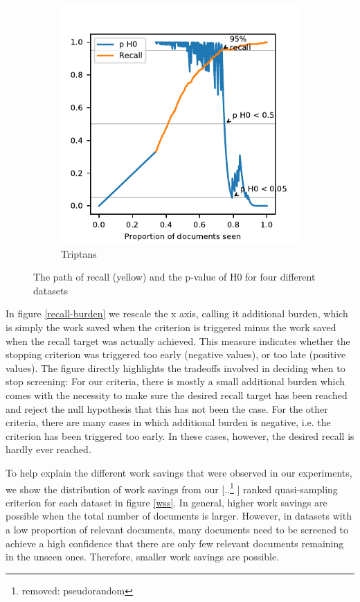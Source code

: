 \documentclass{bmcart}
\providecommand{\DIFadd}[1]{{\protect\color{blue} \sf #1}} %
\providecommand{\DIFdel}[1]{{\protect\color{red} [..\footnote{removed: #1} ]}} %
\providecommand{\DIFaddbegin}{} %
\providecommand{\DIFaddend}{} %
\providecommand{\DIFdelbegin}{} %
\providecommand{\DIFdelend}{} %
\providecommand{\DIFaddbeginFL}{} %
\providecommand{\DIFaddendFL}{} %
\providecommand{\DIFdelendFL}{} %
\newcommand{\DIFscaledelfig}{0.5}
\newlength{\DIFdelgraphicswidth} %
\newlength{\DIFdelgraphicsheight} %
\newcommand{\DIFaddincludegraphics}[2][]{{\color{blue}\fbox{\DIFOincludegraphics[#1]{#2}}}} %
\newcommand{\DIFdelincludegraphics}[2][]{%
\sbox{\DIFdelgraphicsbox}{\DIFOincludegraphics[#1]{#2}}%
\settoboxwidth{\DIFdelgraphicswidth}{\DIFdelgraphicsbox} %
\settoboxtotalheight{\DIFdelgraphicsheight}{\DIFdelgraphicsbox} %
\scalebox{\DIFscaledelfig}{%
\parbox[b]{\DIFdelgraphicswidth}{\usebox{\DIFdelgraphicsbox}\\[-\baselineskip] \rule{\DIFdelgraphicswidth}{0em}}\llap{\resizebox{\DIFdelgraphicswidth}{\DIFdelgraphicsheight}{%
\setlength{\unitlength}{\DIFdelgraphicswidth}%
\begin{picture}(1,1)%
\thicklines\linethickness{2pt} %
{\color[rgb]{1,0,0}\put(0,0){\framebox(1,1){}}}%
{\color[rgb]{1,0,0}\put(0,0){\line( 1,1){1}}}%
{\color[rgb]{1,0,0}\put(0,1){\line(1,-1){1}}}%
\end{picture}%
}\hspace*{3pt}}} %
} %
\DeclareRobustCommand{\DIFaddbegin}{\DIFOaddbegin \let\includegraphics\DIFaddincludegraphics} %
\DeclareRobustCommand{\DIFaddend}{\DIFOaddend \let\includegraphics\DIFOincludegraphics} %
\DeclareRobustCommand{\DIFdelbegin}{\DIFOdelbegin \let\includegraphics\DIFdelincludegraphics} %
\DeclareRobustCommand{\DIFdelend}{\DIFOaddend \let\includegraphics\DIFOincludegraphics} %
\DeclareRobustCommand{\DIFaddbeginFL}{\DIFOaddbeginFL \let\includegraphics\DIFaddincludegraphics} %
\DeclareRobustCommand{\DIFaddendFL}{\DIFOaddendFL \let\includegraphics\DIFOincludegraphics} %
\DeclareRobustCommand{\DIFdelendFL}{\DIFOaddendFL \let\includegraphics\DIFOincludegraphics} %
\begin{document}
\begin{figure}
\begin{subfigure}[b]{0.475\textwidth}
\DIFdelendFL \DIFaddbeginFL \includegraphics[width=\textwidth]{2_figs_h0_paths_Triptans.pdf}
			\DIFaddendFL \caption[]%
			{{\small Triptans}}    
			\label{fig:Triptans}
		\end{subfigure}

		\caption{\small The path of recall (yellow) and the p-value of H0 for four different datasets} 
		\label{H0paths}
	\end{figure}

	In figure \ref{recall-burden} we rescale the x axis, calling it additional burden, which is simply the work saved when the criterion is triggered minus the work saved when the recall target was actually achieved. This measure indicates whether the stopping criterion was triggered too early (negative values), or too late (positive values). The figure directly highlights the tradeoffs involved in deciding when to stop screening: For our criteria, there is mostly a small additional burden which comes with the necessity to make sure the desired recall target has been reached and reject the null hypothesis that this has not been the case. For the other criteria, there are many cases in which additional burden is negative, i.e. the criterion has been triggered too early. In these cases, however, the desired recall is hardly ever reached.

	To help explain the different work savings that were observed in our experiments, we show the distribution of work savings from our \DIFdelbegin \DIFdel{pseudorandom }\DIFdelend \DIFaddbegin \DIFadd{ranked quasi-sampling }\DIFaddend criterion for each dataset in figure \ref{wss}. In general, higher work savings are possible when the total number of documents is larger. However, in datasets with a low proportion of relevant documents, many documents need to be screened to achieve a high confidence that there are only few relevant documents remaining in the unseen ones. Therefore, smaller work savings are possible. 
\end{document}
